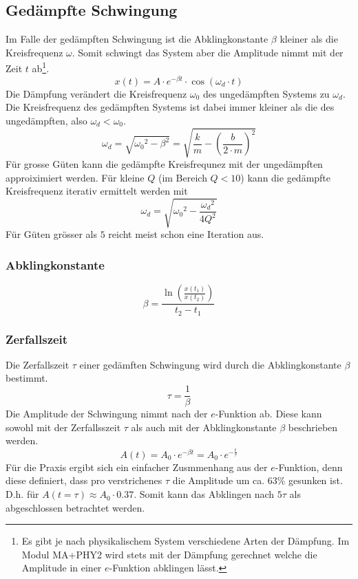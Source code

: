 \subsection{Gedämpfte Schwingung}
Im Falle der gedämpften Schwingung ist die Abklingkonstante $\beta$
kleiner als die Kreisfrequenz $\omega$. Somit schwingt das System
aber die Amplitude nimmt mit der Zeit $t$ ab\footnote{Es gibt je nach
physikalischem System verschiedene Arten der Dämpfung. Im Modul
MA+PHY2 wird stets mit der Dämpfung gerechnet welche die Amplitude
in einer $e$-Funktion abklingen lässt.}.
\[ \boxed{x(t) 
	= A \cdot e^{-\beta t} \cdot \cos(\omega_d \cdot t)
} \]
Die Dämpfung verändert die Kreisfrequenz $\omega_0$ des ungedämpften 
Systems zu $\omega_d$. Die Kreisfrequenz des gedämpften Systems ist
dabei immer kleiner als die des ungedämpften, also $\omega_d < \omega_0$.
\[ \boxed{\omega_d 
	= \sqrt{{\omega_0}^2 - \beta^2} 
	= \sqrt{\frac{k}{m} - \left({\frac{b}{2 \cdot m}}\right)^2}
} \]
Für grosse Güten kann die gedämpfte Kreisfrequnez mit der ungedämpften
approiximiert werden. Für kleine $Q$ (im Bereich $Q<10$) kann die
 gedämpfte Kreisfrequenz iterativ ermittelt werden mit
\[ \omega_d 
	=  \sqrt{{\omega_0}^2 - \frac{{\omega_d}^2}{4Q^2}}
\]
Für Güten grösser als $5$ reicht meist schon eine Iteration aus.

\subsubsection{Abklingkonstante}
\[ \boxed{\beta 
	= \frac{\ln\left(\frac{x(t_1)}{x(t_2)}\right)}{t_2 - t_1}
} \]

\subsubsection{Zerfallszeit}
Die Zerfallszeit $\tau$ einer gedämften Schwingung wird durch die 
Abklingkonstante $\beta$ bestimmt.
\[ \boxed{\tau 
	= \frac{1}{\beta}
} \]
Die Amplitude der Schwingung nimmt nach der $e$-Funktion ab. Diese kann
sowohl mit der Zerfallsszeit $\tau$ als auch mit der Abklingkonstante 
$\beta$ beschrieben werden.
\[ \boxed{A(t) 
	= A_0 \cdot e^{-\beta t} 
	= A_0 \cdot e^{-\frac{t}{\tau}}
} \]
Für die Praxis ergibt sich ein einfacher Zusmmenhang aus der $e$-Funktion,
denn diese definiert, dass pro verstrichenes $\tau$ die Amplitude um ca.
63\% gesunken ist. D.h. für $A(t=\tau) \approx A_0 \cdot 0.37$. Somit kann
das Abklingen nach $5\tau$ als abgeschlossen betrachtet werden.

